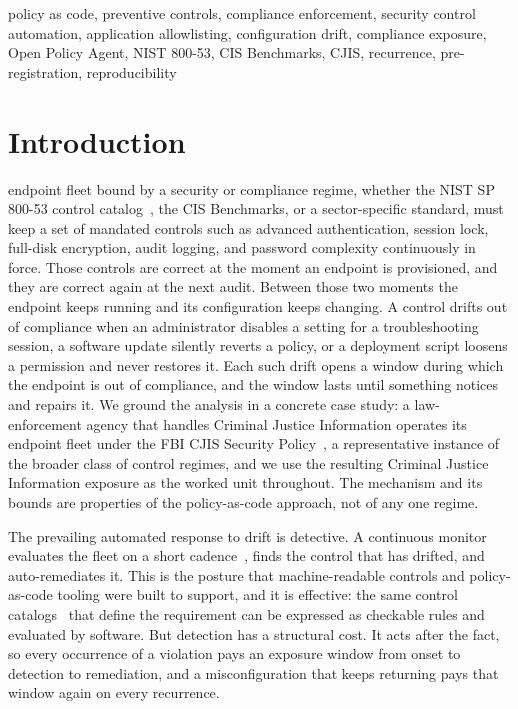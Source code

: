 \documentclass[journal]{IEEEtran}
\begin{document}
\begin{IEEEkeywords}
policy as code, preventive controls, compliance enforcement, security control automation,
application allowlisting, configuration drift, compliance exposure, Open Policy Agent, NIST 800-53,
CIS Benchmarks, CJIS, recurrence, pre-registration, reproducibility
\end{IEEEkeywords}

\section{Introduction}
 endpoint fleet bound by a security or compliance regime, whether the NIST SP
800-53 control catalog~\cite{nist80053}, the CIS Benchmarks, or a sector-specific standard, must
keep a set of mandated controls such as advanced authentication, session lock, full-disk
encryption, audit logging, and password complexity continuously in force. Those controls are correct
at the moment an endpoint is provisioned, and they are correct again at the next audit. Between those
two moments the endpoint keeps running and its configuration keeps changing. A control drifts out of
compliance when an administrator disables a setting for a troubleshooting session, a software update
silently reverts a policy, or a deployment script loosens a permission and never restores it. Each
such drift opens a window during which the endpoint is out of compliance, and the window lasts until
something notices and repairs it. We ground the analysis in a concrete case study: a law-enforcement
agency that handles Criminal Justice Information operates its endpoint fleet under the FBI CJIS
Security Policy~\cite{cjis2023}, a representative instance of the broader class of control regimes,
and we use the resulting Criminal Justice Information exposure as the worked unit throughout. The
mechanism and its bounds are properties of the policy-as-code approach, not of any one regime.

The prevailing automated response to drift is detective. A continuous monitor evaluates the fleet
on a short cadence~\cite{nist80137,nist80137a}, finds the control that has drifted, and
auto-remediates it. This is the posture that machine-readable controls and policy-as-code tooling
were built to support, and it is effective: the same control catalogs~\cite{nist80053} that define
the requirement can be expressed as checkable rules and evaluated by software. But detection has a
structural cost. It acts after the fact, so every occurrence of a violation pays an exposure window
from onset to detection to remediation, and a misconfiguration that keeps returning pays that
window again on every recurrence.
\end{document}
